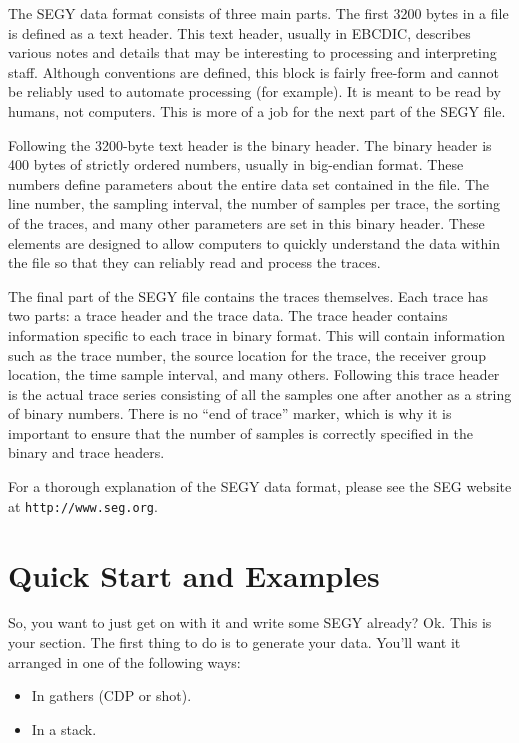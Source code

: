 \documentclass[10pt]{article}
\newcommand{\segy}{{\scriptsize SEGY}\xspace}
\newcommand{\ebcdic}{{\scriptsize EBCDIC}\xspace}
\newcommand{\cdp}{{\scriptsize CDP}\xspace}
\begin{document}
The \segy data format consists of three main parts. The first 3200
bytes in a file is defined as a text header. This text header,
usually in \ebcdic, describes various notes and details that may be
interesting to processing and interpreting staff. Although conventions
are defined, this block is fairly free-form and cannot be reliably
used to automate processing (for example). It is meant to be read by
humans, not computers. This is more of a job for the next part of the
\segy file.

Following the 3200-byte text header is the binary header. The binary
header is 400 bytes of strictly ordered numbers, usually in big-endian
format. These numbers define parameters about the entire data set
contained in the file. The line number, the sampling interval, the
number of samples per trace, the sorting of the traces, and many other
parameters are set in this binary header. These elements are designed
to allow computers to quickly understand the data within the file so
that they can reliably read and process the traces.

The final part of the \segy file contains the traces themselves. Each
trace has two parts: a trace header and the trace data. The trace
header contains information specific to each trace in binary
format. This will contain information such as the trace number, the
source location for the trace, the receiver group location, the time
sample interval, and many others. Following this trace header is the
actual trace series consisting of all the samples one after
another as a string of binary numbers. There is no ``end of trace''
marker, which is why it is important to ensure that the number of
samples is correctly specified in the binary and trace headers.

For a thorough explanation of the \segy data format, please see the
{\scriptsize SEG} website at {\tt http://www.seg.org}.

\section{Quick Start and Examples}
So, you want to just get on with it and write some \segy already?  Ok.
This is your section. The first thing to do is to generate your data.
You'll want it arranged in one of the following ways:
\begin{itemize}
\item In gathers (\cdp or shot). 
\item In a stack.
\end{itemize}
\end{document}
